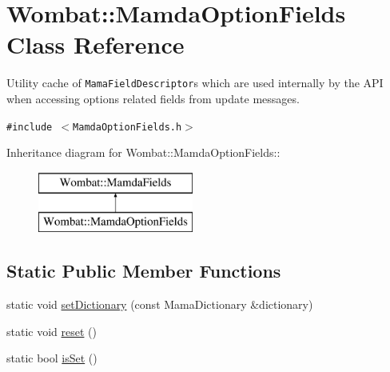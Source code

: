 \hypertarget{classWombat_1_1MamdaOptionFields}{
\section{Wombat::Mamda\-Option\-Fields Class Reference}
\label{classWombat_1_1MamdaOptionFields}
}
Utility cache of {\tt Mama\-Field\-Descriptor}s which are used internally by the API when accessing options related fields from update messages.  


{\tt \#include $<$Mamda\-Option\-Fields.h$>$}

Inheritance diagram for Wombat::Mamda\-Option\-Fields::\begin{figure}[H]
\begin{center}
\leavevmode
\includegraphics[height=2cm]{classWombat_1_1MamdaOptionFields}
\end{center}
\end{figure}
\subsection*{Static Public Member Functions}
\begin{CompactItemize}
\item 
static void \hyperlink{classWombat_1_1MamdaOptionFields_4b8a39f6b591cf20fd8b61f059fc5cb6}{set\-Dictionary} (const Mama\-Dictionary \&dictionary)
\item 
static void \hyperlink{classWombat_1_1MamdaOptionFields_a962211cff154a0b2219f6b630b7beb4}{reset} ()
\item 
static bool \hyperlink{classWombat_1_1MamdaOptionFields_55fa3901843c9eeac615b4caf20d9312}{is\-Set} ()
\end{CompactItemize}
